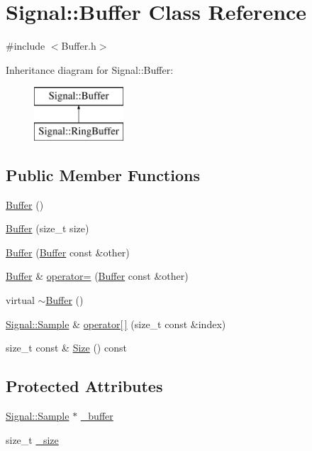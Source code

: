 \hypertarget{classSignal_1_1Buffer}{\section{Signal\+:\+:Buffer Class Reference}
\label{classSignal_1_1Buffer}
}


{\ttfamily \#include $<$Buffer.\+h$>$}

Inheritance diagram for Signal\+:\+:Buffer\+:\begin{figure}[H]
\begin{center}
\leavevmode
\includegraphics[height=2.000000cm]{classSignal_1_1Buffer}
\end{center}
\end{figure}
\subsection*{Public Member Functions}
\begin{DoxyCompactItemize}
\item 
\hyperlink{classSignal_1_1Buffer_ab558e80dac4ef396b9c9310fd914936f}{Buffer} ()
\item 
\hyperlink{classSignal_1_1Buffer_a002c329b3f2b4eaa388b27cc0796f68f}{Buffer} (size\+\_\+t size)
\item 
\hyperlink{classSignal_1_1Buffer_a89a0e919b2aa5f46f2c44137443128fc}{Buffer} (\hyperlink{classSignal_1_1Buffer}{Buffer} const \&other)
\item 
\hyperlink{classSignal_1_1Buffer}{Buffer} \& \hyperlink{classSignal_1_1Buffer_a9f9f08e2cdf35d15164997455303a2d9}{operator=} (\hyperlink{classSignal_1_1Buffer}{Buffer} const \&other)
\item 
virtual \hyperlink{classSignal_1_1Buffer_aa0a51349fdc5b8d41183e7971e8e799b}{$\sim$\+Buffer} ()
\item 
\hyperlink{classSignal_1_1Sample}{Signal\+::\+Sample} \& \hyperlink{classSignal_1_1Buffer_a0b4ced776c42720b214f6054fa21547a}{operator\mbox{[}$\,$\mbox{]}} (size\+\_\+t const \&index)
\item 
size\+\_\+t const \& \hyperlink{classSignal_1_1Buffer_ad0350078d641ed5cb15a9401d9d20ffe}{Size} () const 
\end{DoxyCompactItemize}
\subsection*{Protected Attributes}
\begin{DoxyCompactItemize}
\item 
\hyperlink{classSignal_1_1Sample}{Signal\+::\+Sample} $\ast$ \hyperlink{classSignal_1_1Buffer_ae88831d6fdf8fd7591d5dd7f79531d5f}{\+\_\+buffer}
\item 
size\+\_\+t \hyperlink{classSignal_1_1Buffer_ab4c8969e972323306ee51538ad70577b}{\+\_\+size}
\end{DoxyCompactItemize}


